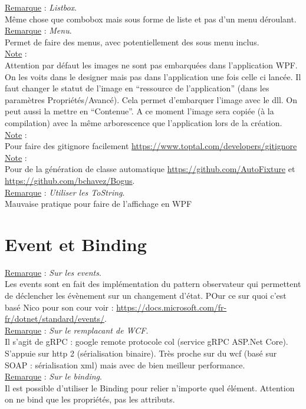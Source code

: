 \documentclass[a4paper,12pt,twoside]{article}
\newcommand{\rem}[2]{\noindent\underline{Remarque} : \textit{#1}.\\ \indent #2}
\newcommand{\note}[1]{\noindent\underline{Note} : \\ \indent #1}
\begin{document}
\rem{Listbox}{Même chose que combobox mais sous forme de liste et pas d'un menu déroulant.}\\

\rem{Menu}{Permet de faire des menus, avec potentiellement des sous menu inclus.}\\

\note{Attention par défaut les images ne sont pas embarquées dans l'application WPF. On les voits dans le designer mais pas dans l'application une fois celle ci lancée. Il faut changer le statut de l'image en ``ressource de l'application'' (dans les paramètres Propriétés/Avancé). Cela permet d'embarquer l'image avec le dll. On peut aussi la mettre en ``Contenue''. A ce moment l'image sera copiée (à la compilation) avec la même arborescence que l'application lors de la création.}\\

\note{Pour faire des gitignore facilement \url{https://www.toptal.com/developers/gitignore}}\\

\note{Pour de la génération de classe automatique \url{https://github.com/AutoFixture} et \url{https://github.com/bchavez/Bogus}.}\\


\rem{Utiliser les ToString}{Mauvaise pratique pour faire de l'affichage en WPF}\\

\section{Event et Binding}

\rem{Sur les events}{Les events sont en fait des implémentation du pattern observateur qui permettent de déclencher les évènement sur un changement d'état. POur ce sur quoi c'est basé Nico pour son cour voir : \url{https://docs.microsoft.com/fr-fr/dotnet/standard/events/}.}\\

\rem{Sur le remplacant de WCF}{Il s'agit de gRPC : google remote protocole col (service gRPC ASP.Net Core). S'appuie sur http 2 (sérialisation binaire). Très proche sur du wcf (basé sur SOAP : sérialisation xml) mais avec de bien meilleur performance.}\\

\rem{Sur le binding}{Il est possible d'utiliser le Binding pour relier n'importe quel élément. Attention on ne bind que les propriétés, pas les attributs.}\\
\end{document}

